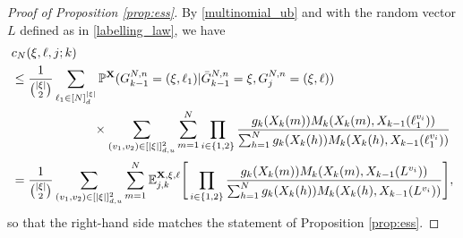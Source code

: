 \documentclass[a4paper,11pt]{article}
\theoremstyle{definition}
\newcommand{\bbP}{\mathbb{P}}
\newcommand{\bbE}{\mathbb{E}}
\newcommand{\bfX}{\mathbf{X}}
\begin{document}
\begin{proof}[Proof of Proposition \ref{prop:ess}]

By \eqref{multinomial_ub} and with the random vector $L$ defined as in \eqref{labelling_law}, we have
\begin{align}
&c_N( \xi, \ell, j; k ) \label{prop3.2_ub} \\
&\leq \frac{1}{\binom{ | \xi | }{ 2 }} \sum_{ \ell_1 \in [ N ]_d^{ | \xi | } } \bbP^{ \bfX }( G_{ k - 1 }^{ N, n } = ( \xi, \ell_1 ) | \bar{ G }_{ k - 1 }^{ N, n } = \xi, G_j^{ N, n } = ( \xi, \ell ) ) \notag \\
&\phantom{ \leq \frac{1}{\binom{ | \xi | }{ 2 }} \sum_{ \ell_1 \in [ N ]_d^{ | \xi | } } } \times \sum_{ ( v_1, v_2 ) \in [ | \xi | ]_{ d, u }^2 }\sum_{ m = 1 }^N \prod_{ i \in \{ 1, 2 \} } \frac{ g_k( X_k( m ) ) M_k( X_k( m ), X_{ k - 1 }( \ell_1^{ v_i } ) ) }{ \sum_{ h = 1 }^N g_k( X_k( h ) ) M_k( X_k( h ), X_{ k - 1 }( \ell_1^{ v_i } ) ) } \notag \\
&= \frac{1}{\binom{ | \xi | }{ 2 }} \sum_{ ( v_1, v_2 ) \in [ | \xi | ]_{ d, u }^2 } \sum_{ m = 1 }^N \bbE_{ j, k }^{ \bfX, \xi, \ell } \Bigg[ \prod_{ i \in \{ 1, 2 \} } \frac{ g_k( X_k( m ) ) M_k( X_k( m ), X_{ k - 1 }( L^{ v_i } ) ) }{ \sum_{ h = 1 }^N g_k( X_k( h ) ) M_k( X_k( h ), X_{ k - 1 }( L^{ v_i } ) ) } \Bigg], \notag
\end{align}
so that the right-hand side matches the statement of Proposition \ref{prop:ess}.


\end{proof}
\end{document}
